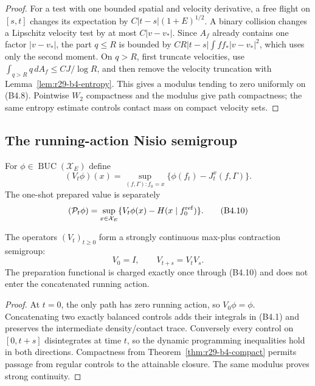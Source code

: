 \begin{proof}
For a test with one bounded spatial and velocity derivative, a free flight on
$[s,t]$ changes its expectation by
$C|t-s|(1+E)^{1/2}$.  A binary collision changes a Lipschitz velocity test by
at most $C|v-v_*|$.  Since $A_f$ already contains one factor
$|v-v_*|$, the part $q\le R$ is bounded by
$CR|t-s|\int ff_*|v-v_*|^2$, which uses only the second moment.  On $q>R$,
first truncate velocities, use
$\int_{q>R}q\,dA_f\le C J/\log R$, and then remove the velocity truncation
with Lemma~\ref{lem:r29-b4-entropy}.  This gives a modulus tending to zero
uniformly on (B4.8).  Pointwise $W_2$ compactness and the modulus give path
compactness; the same entropy estimate controls contact mass on compact
velocity sets.
\end{proof}

\subsection{The running-action Nisio semigroup}

For $\phi\in\operatorname{BUC}(\mathcal X_E)$ define
\[
 (V_t\phi)(x)=
 \sup_{(f,\Gamma):f_0=x}
 \{\phi(f_t)-J_t^x(f,\Gamma)\}.                           \tag{B4.9}
\]
The one-shot prepared value is separately
\[
 (\mathcal P_t\phi)=
 \sup_{x\in\mathcal X_E}\{V_t\phi(x)-H(x\mid f_0^{\rm ref})\}.          \tag{B4.10}
\]

\begin{theorem}
\label{thm:r29-b4-semigroup}
The operators $(V_t)_{t\ge0}$ form a strongly continuous max-plus contraction
semigroup:
\[
 V_0=I,\qquad V_{t+s}=V_tV_s.                             \tag{B4.11}
\]
The preparation functional is charged exactly once through (B4.10) and does
not enter the concatenated running action.
\end{theorem}

\begin{proof}
At $t=0$, the only path has zero running action, so $V_0\phi=\phi$.
Concatenating two exactly balanced controls adds their integrals in (B4.1) and
preserves the intermediate density/contact trace.  Conversely every control
on $[0,t+s]$ disintegrates at time $t$, so the dynamic programming inequalities
hold in both directions.  Compactness from Theorem~\ref{thm:r29-b4-compact}
permits passage from regular controls to the attainable closure.  The same
modulus proves strong continuity.
\end{proof}


